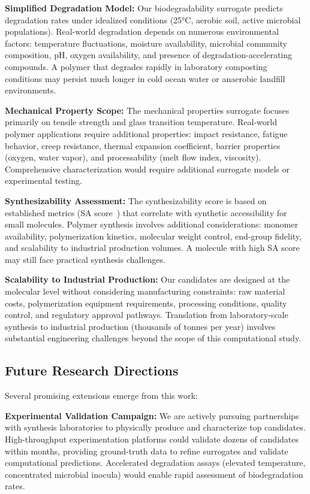 \documentclass[twocolumn,10pt]{article}
\begin{document}
\textbf{Simplified Degradation Model:} Our biodegradability surrogate predicts degradation rates under idealized conditions (25°C, aerobic soil, active microbial populations). Real-world degradation depends on numerous environmental factors: temperature fluctuations, moisture availability, microbial community composition, pH, oxygen availability, and presence of degradation-accelerating compounds. A polymer that degrades rapidly in laboratory composting conditions may persist much longer in cold ocean water or anaerobic landfill environments.

\textbf{Mechanical Property Scope:} The mechanical properties surrogate focuses primarily on tensile strength and glass transition temperature. Real-world polymer applications require additional properties: impact resistance, fatigue behavior, creep resistance, thermal expansion coefficient, barrier properties (oxygen, water vapor), and processability (melt flow index, viscosity). Comprehensive characterization would require additional surrogate models or experimental testing.

\textbf{Synthesizability Assessment:} The synthesizability score is based on established metrics (SA score~\cite{ertl2009estimation}) that correlate with synthetic accessibility for small molecules. Polymer synthesis involves additional considerations: monomer availability, polymerization kinetics, molecular weight control, end-group fidelity, and scalability to industrial production volumes. A molecule with high SA score may still face practical synthesis challenges.

\textbf{Scalability to Industrial Production:} Our candidates are designed at the molecular level without considering manufacturing constraints: raw material costs, polymerization equipment requirements, processing conditions, quality control, and regulatory approval pathways. Translation from laboratory-scale synthesis to industrial production (thousands of tonnes per year) involves substantial engineering challenges beyond the scope of this computational study.

\subsection{Future Research Directions}

Several promising extensions emerge from this work:

\textbf{Experimental Validation Campaign:} We are actively pursuing partnerships with synthesis laboratories to physically produce and characterize top candidates. High-throughput experimentation platforms could validate dozens of candidates within months, providing ground-truth data to refine surrogates and validate computational predictions. Accelerated degradation assays (elevated temperature, concentrated microbial inocula) would enable rapid assessment of biodegradation rates.
\end{document}
